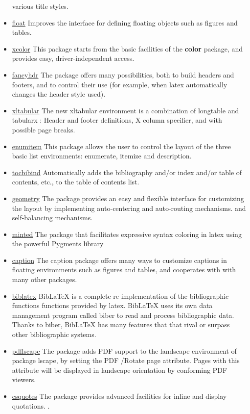 \begin{itemize}
          various title styles.
    \item \href{https://www.ctan.org/pkg/float}{float} Improves the interface for defining floating objects
          such as figures and tables.
    \item \href{https://www.ctan.org/pkg/xcolor}{xcolor} This package starts from the basic facilities
          of the \textbf{color} package, and provides easy, driver-independent access. \label{color}
    \item \href{https://www.ctan.org/pkg/fancyhdr}{fancyhdr} The package offers many possibilities,
          both to build headers and footers, and to control their use (for example, when \gls{latex} automatically changes the header style used).
    \item \href{https://www.ctan.org/pkg/xltabular}{xltabular} The new xltabular environment is a combination
          of longtable and tabularx : Header and footer definitions, X column specifier,
          and with possible page breaks.
    \item \href{https://www.ctan.org/pkg/enumitem}{enumitem} This package allows the user to control
          the layout of the three basic list environments: enumerate, itemize and description.
    \item \href{https://www.ctan.org/pkg/tocbibind}{tocbibind} Automatically adds the bibliography and/or
          index and/or table of contents, etc., to the table of contents list.
    \item \href{https://www.ctan.org/pkg/geometry}{geometry} The package provides an easy and flexible
          interface for customizing the layout by implementing auto-centering and auto-routing mechanisms.
          and self-balancing mechanisms.
    \item \href{https://www.ctan.org/pkg/minted}{minted} The package that facilitates expressive syntax coloring in
          \gls{latex} using the powerful Pygments library
    \item \href{https://www.ctan.org/pkg/caption}{caption} The caption package offers many ways to customize captions
          in floating environments such as figures and tables, and cooperates with with many other packages.
    \item \href{https://www.ctan.org/pkg/biblatex}{biblatex} BibLaTeX is a complete re-implementation of the bibliographic functions
          functions provided by \gls{latex}. BibLaTeX uses its own data management program called biber
          to read and process bibliographic data. Thanks to biber, BibLaTeX has many features that
          that rival or surpass other bibliographic systems.
    \item \href{https://ctan.org/pkg/pdflscape}{pdflscape} The package adds PDF support to the landscape
          environment of package lscape, by setting the PDF /Rotate page attribute. Pages with this attribute will be displayed
          in landscape orientation by conforming PDF viewers.
    \item \href{https://ctan.org/pkg/csquotes}{csquotes} The package provides advanced facilities for inline and display quotations. .
\end{itemize}

